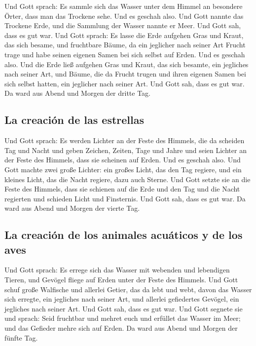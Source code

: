  Und Gott sprach: Es sammle sich das Wasser unter dem
Himmel an besondere Örter, dass man das Trockene sehe. Und es geschah
also.  Und Gott nannte das Trockene Erde, und die
Sammlung der Wasser nannte er Meer. Und Gott sah, dass es gut war.
 Und Gott sprach: Es lasse die Erde aufgehen Gras und
Kraut, das sich besame, und fruchtbare Bäume, da ein jeglicher nach
seiner Art Frucht trage und habe seinen eigenen Samen bei sich selbst
auf Erden. Und es geschah also.  Und die Erde ließ
aufgehen Gras und Kraut, das sich besamte, ein jegliches nach seiner
Art, und Bäume, die da Frucht trugen und ihren eigenen Samen bei sich
selbst hatten, ein jeglicher nach seiner Art. Und Gott sah, dass es gut
war.  Da ward aus Abend und Morgen der dritte Tag.

\hypertarget{la-creaciuxf3n-de-las-estrellas}{%
\subsection{La creación de las
estrellas}\label{la-creaciuxf3n-de-las-estrellas}}

 Und Gott sprach: Es werden Lichter an der Feste des
Himmels, die da scheiden Tag und Nacht und geben Zeichen, Zeiten, Tage
und Jahre  und seien Lichter an der Feste des Himmels,
dass sie scheinen auf Erden. Und es geschah also.  Und
Gott machte zwei große Lichter: ein großes Licht, das den Tag regiere,
und ein kleines Licht, das die Nacht regiere, dazu auch Sterne.
 Und Gott setzte sie an die Feste des Himmels, dass sie
schienen auf die Erde  und den Tag und die Nacht
regierten und schieden Licht und Finsternis. Und Gott sah, dass es gut
war.  Da ward aus Abend und Morgen der vierte Tag.

\hypertarget{la-creaciuxf3n-de-los-animales-acuuxe1ticos-y-de-los-aves}{%
\subsection{La creación de los animales acuáticos y de los
aves}\label{la-creaciuxf3n-de-los-animales-acuuxe1ticos-y-de-los-aves}}

 Und Gott sprach: Es errege sich das Wasser mit webenden
und lebendigen Tieren, und Gevögel fliege auf Erden unter der Feste des
Himmels.  Und Gott schuf große Walfische und allerlei
Getier, das da lebt und webt, davon das Wasser sich erregte, ein
jegliches nach seiner Art, und allerlei gefiedertes Gevögel, ein
jegliches nach seiner Art. Und Gott sah, dass es gut war.
 Und Gott segnete sie und sprach: Seid fruchtbar und
mehret euch und erfüllet das Wasser im Meer; und das Gefieder mehre sich
auf Erden.  Da ward aus Abend und Morgen der fünfte Tag.

